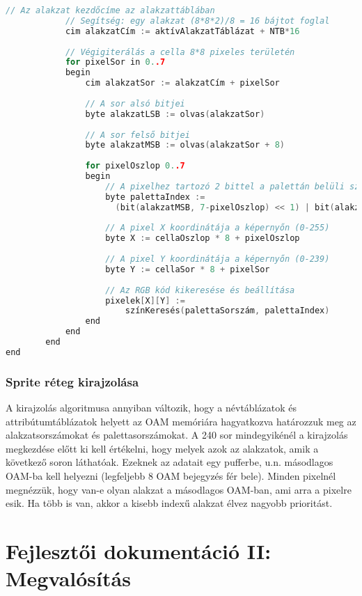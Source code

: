 \begin{lstlisting}[backgroundcolor = \color{white}, language=c]
			// Az alakzat kezdőcíme az alakzattáblában
			// Segítség: egy alakzat (8*8*2)/8 = 16 bájtot foglal
			cim alakzatCím := aktívAlakzatTáblázat + NTB*16
				
			// Végigiterálás a cella 8*8 pixeles területén
			for pixelSor in 0..7
			begin
				cim alakzatSor := alakzatCím + pixelSor
				
				// A sor alsó bitjei
				byte alakzatLSB := olvas(alakzatSor)
				
				// A sor felső bitjei		
				byte alakzatMSB := olvas(alakzatSor + 8)
				
				for pixelOszlop 0..7
				begin
					// A pixelhez tartozó 2 bittel a palettán belüli szín meghatározása
					byte palettaIndex := 
					  (bit(alakzatMSB, 7-pixelOszlop) << 1) | bit(alakzatLSB, 7-pixelOszlop)
					
					// A pixel X koordinátája a képernyőn (0-255)
					byte X := cellaOszlop * 8 + pixelOszlop
					
					// A pixel Y koordinátája a képernyőn (0-239)
					byte Y := cellaSor * 8 + pixelSor
				
					// Az RGB kód kikeresése és beállítása
					pixelek[X][Y] := 
						színKeresés(palettaSorszám, palettaIndex)
				end
			end
		end
end


\end{lstlisting}

\subsection{Sprite réteg kirajzolása}

A kirajzolás algoritmusa annyiban változik, hogy a névtáblázatok és attribútumtáblázatok helyett az OAM memóriára hagyatkozva határozzuk meg az alakzatsorszámokat és palettasorszámokat.
A 240 sor mindegyikénél a kirajzolás megkezdése előtt ki kell értékelni, hogy melyek azok az alakzatok, amik a következő soron láthatóak. Ezeknek az adatait egy pufferbe, u.n. másodlagos OAM-ba kell helyezni (legfeljebb 8 OAM bejegyzés fér bele). Minden pixelnél megnézzük, hogy van-e olyan alakzat a másodlagos OAM-ban, ami arra a pixelre esik. Ha több is van, akkor a kisebb indexű alakzat élvez nagyobb prioritást. 

\clearpage

\chapter{Fejlesztői dokumentáció II: Megvalósítás} %

